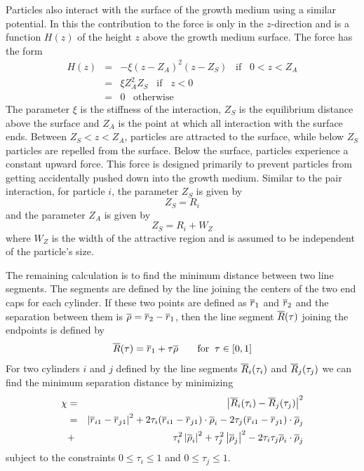 \documentclass[12pt]{article}
\begin{document}
Particles also interact with the surface of the growth medium using a similar potential. In this
the contribution to the force is only in the $z$-direction and is a function $H(z)$ of the height $z$ above
the growth medium surface. The force has the form
\begin{eqnarray*}
H(z) & = & -\xi (z-Z_A)^2(z-Z_S)\;\;\;\mbox{if}\;\;\;0<z<Z_A \\
& = & \xi Z_A^2Z_S\;\;\;\mbox{if}\;\;\;z<0 \\
& = & 0\;\;\;\mbox{otherwise}
\end{eqnarray*}
The parameter $\xi$ is the stiffness of the interaction, $Z_S$ is the equilibrium distance above the surface
and $Z_A$ is the point at which all interaction with the surface ends. Between $Z_S<z<Z_A$, particles are
attracted to the surface, while below $Z_S$ particles are repelled from the surface. Below the surface,
particles experience a constant upward force. This force is designed primarily to prevent particles from
getting accidentally pushed down into the growth medium. Similar to the pair interaction, for particle $i$,
the parameter $Z_S$ is given by
\[
Z_S = R_i
\]
and the parameter $Z_A$ is given by
\[
Z_S = R_i + W_Z
\]
where $W_Z$ is the width of the attractive region and is assumed to be independent of the particle's size.

The remaining calculation is to find the  minimum distance between two
line segments. The segments are defined by the line joining the centers of the two
end caps for each cylinder. If these two points are defined as $\overline{r}_1$ and $\overline{r}_2$
and the separation between them is $\overline{\rho} = \overline{r}_2-\overline{r}_1$, then the line
segment $\overline{R}(\tau)$ joining the endpoints is defined by
\[
\overline{R}(\tau) = \overline{r}_1 +\tau\overline{\rho}\;\;\;\;\;\;\;\mbox{for}\;\;\tau\in [0,1]
\]
For two cylinders $i$ and $j$ defined by the line segments $\overline{R}_i(\tau_i)$ and
$\overline{R}_j(\tau_j)$ we can find the minimum separation distance by minimizing
\begin{eqnarray*}
\chi & = & \left|\overline{R}_i(\tau_i)-\overline{R}_j(\tau_j)\right|^2 \\
     & = & \left|\overline{r}_{i1}-\overline{r}_{j1}\right|^2+2\tau_i(\overline{r}_{i1}-\overline{r}_{j1})\cdot\overline{\rho}_i
          -2\tau_j(\overline{r}_{i1}-\overline{r}_{j1})\cdot\overline{\rho}_j \\
     & + & \tau_i^2\left|\overline{\rho}_i\right|^2 + \tau_j^2\left|\overline{\rho}_j\right|^2
           - 2\tau_i\tau_j\overline{\rho}_i\cdot\overline{\rho}_j
\end{eqnarray*}
subject to the constraints $0\le\tau_i\le 1$ and $0\le\tau_j\le 1$.
\end{document}
